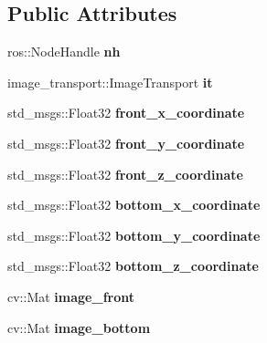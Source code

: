 \subsection*{Public Attributes}
\begin{DoxyCompactItemize}
\item 
\mbox{\label{classBase__class_a0c637b9d05ba44ce2d9b72325f55b93e}} 
ros\+::\+Node\+Handle {\bfseries nh}
\item 
\mbox{\label{classBase__class_a220ef4029efe5d7f0e6a2f05ed243ca7}} 
image\+\_\+transport\+::\+Image\+Transport {\bfseries it}
\item 
\mbox{\label{classBase__class_a4dc6972ad9bc616b6430a631bd03defa}} 
std\+\_\+msgs\+::\+Float32 {\bfseries front\+\_\+x\+\_\+coordinate}
\item 
\mbox{\label{classBase__class_a093214b7b4e70f5c5aa08acc9c650882}} 
std\+\_\+msgs\+::\+Float32 {\bfseries front\+\_\+y\+\_\+coordinate}
\item 
\mbox{\label{classBase__class_a1dc276a367c03d2a54516613bc8005f4}} 
std\+\_\+msgs\+::\+Float32 {\bfseries front\+\_\+z\+\_\+coordinate}
\item 
\mbox{\label{classBase__class_a30acee1702ef9b5cb42032ba5c451276}} 
std\+\_\+msgs\+::\+Float32 {\bfseries bottom\+\_\+x\+\_\+coordinate}
\item 
\mbox{\label{classBase__class_a8ff5e8a73f05506118a9d442c1a8a99b}} 
std\+\_\+msgs\+::\+Float32 {\bfseries bottom\+\_\+y\+\_\+coordinate}
\item 
\mbox{\label{classBase__class_ad1a1fcdaaa8103c14d66ad2d1efa00f2}} 
std\+\_\+msgs\+::\+Float32 {\bfseries bottom\+\_\+z\+\_\+coordinate}
\item 
\mbox{\label{classBase__class_a17f406063739c71815f4bbe990ef4df0}} 
cv\+::\+Mat {\bfseries image\+\_\+front}
\item 
\mbox{\label{classBase__class_a093e57e2b6f567e565738c89964d3e24}} 
cv\+::\+Mat {\bfseries image\+\_\+bottom}

\end{DoxyCompactItemize}
